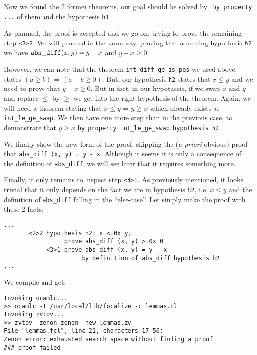 \documentclass[11pt,a4paper,twoside,onecolumn,fullpage]{article}
\begin{document}
Now we found the 2 former theorems, our goal should be solved by
\zenon\ \lstinline"by property ..." of them and the hypothesis
\lstinline"h1".

{\scriptsize
}

As planned, the proof is accepted and we go on, trying to prove the
remaining step \lstinline"<2>2". We will proceed in the same way,
proving that assuming hypothesis \lstinline"h2" we have
${\tt abs\_diff} (x, y) = y - x$ and $y - x \ge 0$.

However, we can note that the theorem \lstinline"int_diff_ge_is_pos"
we used above states  $(a \ge b) \Rightarrow (a - b \ge 0)$.
But, our hypothesis \lstinline"h2" states that $x \le y$ and we need
to prove that $y -x \ge 0$. But in fact, in our hypothesis, if we swap $x$ and
$y$ and replace $\le$ by $\ge$ we get into the right hypothesis of the
theorem. Again, we will need a theorem stating that
$x \le y \Rightarrow y \ge x$ which already exists as
\lstinline"int_le_ge_swap". We then have one more step than in the
previous case, to demonstrate that $y \ge x$
\lstinline"by property int_le_ge_swap hypothesis h2".

\medskip
We finally show the new form of the proof, skipping the ({\em a priori}
obvious) proof that {\tt abs\_diff (x, y) = y - x}. Although it seems
it is only a consequence of the definition of \lstinline{abs_diff}, we
will see later that it requires something more.

{\scriptsize
}

Finally, it only remains to inspect step \lstinline"<3>1". As
previously mentioned, it looks trivial that it only depends on the
fact we are in hypothesis \lstinline"h2", i.e. $x \le y$ and the
definition of \lstinline"abs_diff" falling in the ``else-case''. Let
simply make the proof with these 2 facts:

{\scriptsize
\begin{lstlisting}
...
       <2>2 hypothesis h2: x <=0x y,
                 prove abs_diff (x, y) >=0x 0
            <3>1 prove abs_diff (x, y) = y - x
                      by definition of abs_diff hypothesis h2
...
\end{lstlisting}}

\noindent We compile and get:

{\scriptsize
\begin{verbatim}
Invoking ocamlc...
>> ocamlc -I /usr/local/lib/focalize -c lemmas.ml
Invoking zvtov...
>> zvtov -zenon zenon -new lemmas.zv
File "lemmas.fcl", line 21, characters 17-56:                
Zenon error: exhausted search space without finding a proof
### proof failed
\end{verbatim}}
\end{document}
